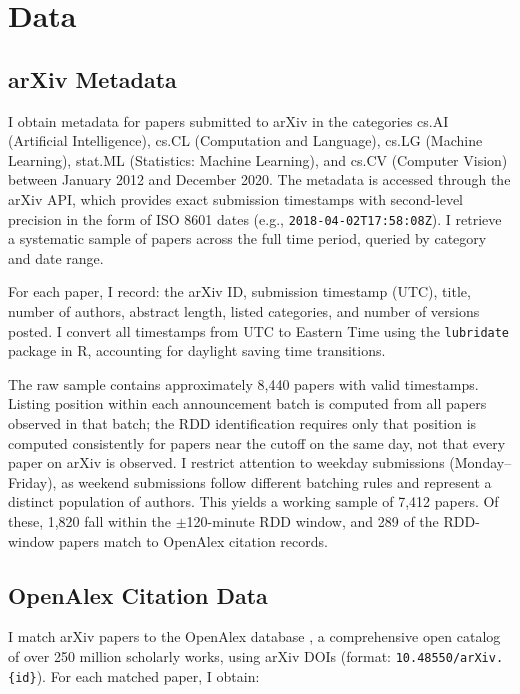 \documentclass[12pt]{article}
\begin{document}
\section{Data}

\subsection{arXiv Metadata}

I obtain metadata for papers submitted to arXiv in the categories cs.AI (Artificial Intelligence), cs.CL (Computation and Language), cs.LG (Machine Learning), stat.ML (Statistics: Machine Learning), and cs.CV (Computer Vision) between January 2012 and December 2020. The metadata is accessed through the arXiv API, which provides exact submission timestamps with second-level precision in the form of ISO 8601 dates (e.g., \texttt{2018-04-02T17:58:08Z}). I retrieve a systematic sample of papers across the full time period, queried by category and date range.

For each paper, I record: the arXiv ID, submission timestamp (UTC), title, number of authors, abstract length, listed categories, and number of versions posted. I convert all timestamps from UTC to Eastern Time using the \texttt{lubridate} package in R, accounting for daylight saving time transitions.

The raw sample contains approximately 8,440 papers with valid timestamps. Listing position within each announcement batch is computed from all papers observed in that batch; the RDD identification requires only that position is computed consistently for papers near the cutoff on the same day, not that every paper on arXiv is observed. I restrict attention to weekday submissions (Monday--Friday), as weekend submissions follow different batching rules and represent a distinct population of authors. This yields a working sample of 7,412 papers. Of these, 1,820 fall within the $\pm$120-minute RDD window, and 289 of the RDD-window papers match to OpenAlex citation records.

\subsection{OpenAlex Citation Data}

I match arXiv papers to the OpenAlex database \citep{priem2022}, a comprehensive open catalog of over 250 million scholarly works, using arXiv DOIs (format: \texttt{10.48550/arXiv.\{id\}}). For each matched paper, I obtain:
\end{document}
